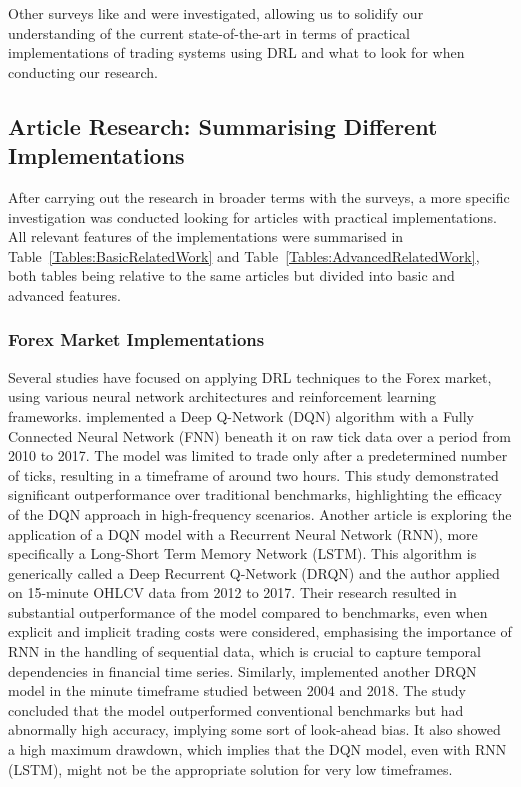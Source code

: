 Other surveys like \cite{pricope_deep_2021} and \cite{alameer_reinforcement_2022} were investigated, allowing us to solidify our understanding of the current state-of-the-art in terms of practical implementations of trading systems using DRL and what to look for when conducting our research.

\subsection{Article Research: Summarising Different Implementations}

After carrying out the research in broader terms with the surveys, a more specific investigation was conducted looking for articles with practical implementations. All relevant features of the implementations were summarised in Table~\ref{Tables:BasicRelatedWork} and Table~\ref{Tables:AdvancedRelatedWork}, both tables being relative to the same articles but divided into basic and advanced features. 

\subsubsection{Forex Market Implementations}

Several studies have focused on applying DRL techniques to the Forex market, using various neural network architectures and reinforcement learning frameworks. \cite{carapuco_reinforcement_2018} implemented a Deep Q-Network (DQN) algorithm with a Fully Connected Neural Network (FNN) beneath it on raw tick data over a period from 2010 to 2017.  The model was limited to trade only after a predetermined number of ticks, resulting in a timeframe of around two hours. This study demonstrated significant outperformance over traditional benchmarks, highlighting the efficacy of the DQN approach in high-frequency scenarios. Another article is \cite{huang_financial_2018} exploring the application of a DQN model with a Recurrent Neural Network (RNN), more specifically a Long-Short Term Memory Network (LSTM). This algorithm is generically called a Deep Recurrent Q-Network (DRQN) and the author applied on 15-minute OHLCV data from 2012 to 2017. Their research resulted in substantial outperformance of the model compared to benchmarks, even when explicit and implicit trading costs were considered, emphasising the importance of RNN in the handling of sequential data, which is crucial to capture temporal dependencies in financial time series. Similarly, \cite{rundo_deep_2019} implemented another DRQN model in the minute timeframe studied between 2004 and 2018. The study concluded that the model outperformed conventional benchmarks but had abnormally high accuracy, implying some sort of look-ahead bias. It also showed a high maximum drawdown, which implies that the DQN model, even with RNN (LSTM), might not be the appropriate solution for very low timeframes.

